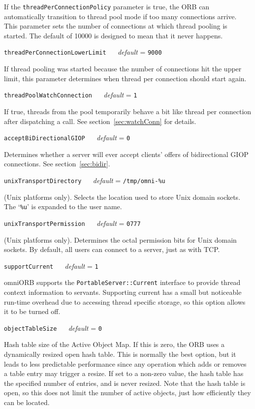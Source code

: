 \documentclass[11pt,twoside,a4paper]{book}
\makeatletter
\newcommand{\type}[1]{\texttt{#1}}
\newcommand{\code}[1]{\texttt{#1}}
\newcommand{\confopt}[2]
  {\vspace{\baselineskip}\par\noindent\code{#1} ~~ \textit{default} =
   \code{#2}}
\renewcommand{\confopt}[2]
  {\vspace{\baselineskip}\par\noindent\code{#1} ~~ \textit{default} =
   \code{#2}\\[-1ex]\@afterheading}
\makeatother
\begin{document}
If the \code{threadPerConnectionPolicy} parameter is true, the ORB can
automatically transition to thread pool mode if too many connections
arrive. This parameter sets the number of connections at which thread
pooling is started. The default of 10000 is designed to mean that it
never happens.


\confopt{threadPerConnectionLowerLimit}{9000}

If thread pooling was started because the number of connections hit
the upper limit, this parameter determines when thread per connection
should start again.


\confopt{threadPoolWatchConnection}{1}

If true, threads from the pool temporarily behave a bit like thread
per connection after dispatching a call. See
section~\ref{sec:watchConn} for details.


\confopt{acceptBiDirectionalGIOP}{0}

Determines whether a server will ever accept clients' offers of
bidirectional GIOP connections. See section~\ref{sec:bidir}.


\confopt{unixTransportDirectory}{/tmp/omni-\%u}

(Unix platforms only). Selects the location used to store Unix domain
sockets. The `\code{\%u}' is expanded to the user name.


\confopt{unixTransportPermission}{0777}

(Unix platforms only). Determines the octal permission bits for Unix
domain sockets. By default, all users can connect to a server, just as
with TCP.


\confopt{supportCurrent}{1}

omniORB supports the \type{PortableServer::Current} interface to
provide thread context information to servants. Supporting current has
a small but noticeable run-time overhead due to accessing thread
specific storage, so this option allows it to be turned off.


\confopt{objectTableSize}{0}

Hash table size of the Active Object Map. If this is zero, the ORB
uses a dynamically resized open hash table. This is normally the best
option, but it leads to less predictable performance since any
operation which adds or removes a table entry may trigger a resize. If
set to a non-zero value, the hash table has the specified number of
entries, and is never resized. Note that the hash table is open, so
this does not limit the number of active objects, just how efficiently
they can be located.
\end{document}

